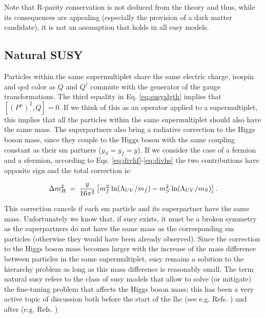 Note that R-parity conservation is not deduced from the theory and thus, while its consequences are appealing (especially the provision of a dark matter candidate), it is not an assumption that holds in all \gls{susy} models.



\subsection{Natural SUSY}

Particles within the same supermultiplet share the same electric charge, isospin and \gls{qcd} color as $Q$ and $Q^\dagger$ commute with the generator of the gauge transformations.
The third equality in Eq. \ref{eq:susyalgth} implies that $[ (P^\mu)^2 , Q  ]=0$. If we think of this as an operator applied to a supermultiplet, this implies that all the particles within the same supermultiplet should also have the same mass. The superpartners also bring a radiative correction to the Higgs boson mass, since they couple to the Higgs boson with the same coupling constant as their \gls{sm} partners ($y_S=y_f=y$). If we consider the case of a fermion and a sfermion, according to Eqs. \ref{eq:divhf}-\ref{eq:divhs} the two contributions have opposite sign and the total correction is:

\begin{equation}
\Delta m_H^2 \>=\> {y\over 16 \pi^2}
\left [ m_f^2
\> {\rm ln}(\Lambda_{UV}/m_f) 
- m_S^2
\> {\rm ln}(\Lambda_{UV}/m_S) 
\right ].
\label{eq:divhsusy}
\end{equation}

This correction cancels if each \gls{sm} particle and its superpartner have the same mass. Unfortunately we know that, if \gls{susy} exists, it must be a broken symmetry as the superpartners do not have the same mass as the corresponding \gls{sm} particles (otherwise they would have been already observed). Since the correction to the Higgs boson mass becomes larger with the increase of the mass difference between particles in the same supermultiplet, \gls{susy} remains a solution to the hierarchy problem as long as this mass difference is reasonably small. The term natural \gls{susy} refers to the class of \gls{susy} models that allow to solve (or mitigate) the fine-tuning problem that affects the Higgs boson mass; this has been a very active topic of discussion both before the start of the \gls{lhc} (see e.g. Refs. \cite{BARBIERI198863, Dimopoulos:1995mi}) and after (e.g. Refs. \cite{Papucci:2011wy, Casas:2014eca}) 

